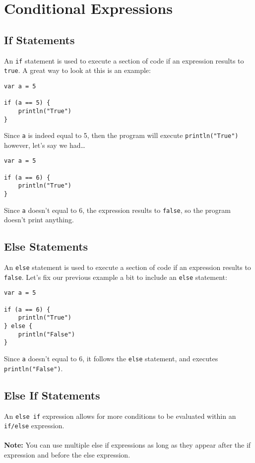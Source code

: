 \chapter{Conditional Expressions}
\section{If Statements}
An \verb!if! statement is used to execute a section of code if an expression 
results to \verb!true!. A great way to look at this is an example: 

\begin{verbatim}
var a = 5

if (a == 5) {
    println("True")
}
\end{verbatim}

Since \verb!a! is indeed equal to 5, then the program will execute
\verb!println("True")! however, let's say we had\dots

\begin{verbatim}
var a = 5

if (a == 6) {
    println("True")
}
\end{verbatim}

Since \verb!a! doesn't equal to 6, the expression 
results to \verb!false!, so the program doesn't print anything.
\newpage
\section{Else Statements}
An \verb!else! statement is used to execute a section of code if an 
expression results to \verb!false!. Let's fix our previous example a bit to include an \verb!else! statement: 

\begin{verbatim}
var a = 5

if (a == 6) {
    println("True")
} else {
    println("False")
}
\end{verbatim}

Since \verb!a! doesn't equal to 6, it follows the \verb!else! statement, and executes \verb!println("False")!.

\section{Else If Statements}
An \verb!else if! expression allows for more conditions to be evaluated within an \verb!if/else! expression.
\\\\
\textbf{Note:} You can use multiple else if expressions as long as they appear after the if expression and before the else expression.

